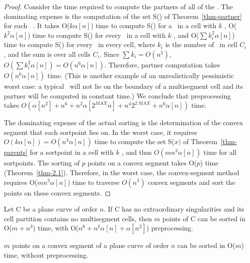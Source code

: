 \begin{proof}
Consider the time required to compute the partners of all of the \wallpoints.
The dominating expense is the computation of the set S(\wo)
of Theorem~\ref{thm-partner} for each \wallpoint\ \wo.
It takes O($k\alpha[n]$) time to compute S(\wo) for a \wallpoint\ in a cell
with $k$ \wallpoints, O($k^{2}\alpha[n]$) time to compute S(\wo) for every 
\wallpoint\ in a cell with $k$ \wallpoints, and O($\sum k_{i}^{2}\alpha[n]$)
time 
to compute S(\wo) for every \wallpoint\ in every cell, where $k_{i}$ is the
number of \wallpoints\ in cell $C_{i}$, and the sum is over all cells $C_{i}$.
Since $\sum k_{i} = O(n^{3})$, 
$O(\sum k_{i}^{2}\alpha[n]) = O(n^{6}\alpha[n])$.
Therefore, partner computation takes $O(n^{6}\alpha[n])$ time.
(This is another example of an unrealistically pessimistic worst case: 
a typical
\wallpoint\ will not lie on the boundary of a multisegment cell and its 
partner will be computed in constant time.)
We conclude that preprocessing takes 
$O(\alpha[n^{2}] + n^{6} + n^{2}\alpha[2^{MAX}n] + 
n^{4}2^{2\ MAX} + n^{6}\alpha[n])$ time.

The dominating expense of the actual sorting is the determination of the
convex segment that each sortpoint lies on.
In the worst case, it requires $O(k\alpha[n]) = O(n^{3}\alpha[n])$ time to 
compute the set S($x)$ of Theorem~\ref{thm-parents} for a sortpoint in a cell with $k$ \wallpoints, and thus $O(mn^{3}\alpha[n])$ time for all
sortpoints.
The sorting of $p$ points on a convex segment
takes O($p$) time (Theorem~\ref{thm-2.1}).
Therefore, in the worst case, the convex-segment method requires 
O($mn^{3}\alpha[n]$) time to traverse $O(n^{3})$ convex segments
and sort the points on these convex segments.
\end{proof}

\begin{corollary}
Let C be a plane curve of order $n$. 
If C has no extraordinary singularities and its
cell partition contains no multisegment 
cells, then $m$ points of C can be sorted
in O($m+n^{3}$) time, with  O($n^6 + n^2\alpha[n] + \alpha[n^{2}]$)
preprocessing.
\end{corollary}

\begin{corollary}
$m$ points on a convex segment of a plane curve of order $n$ can be sorted 
in O($m$) time, without preprocessing.
\end{corollary}
%
%
